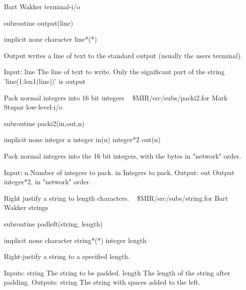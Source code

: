 \newline {} Bart Wakker
\newline {} terminal-i/o
\par{\tenpoint
{\eightpoint\begintt
        subroutine output(line)

        implicit none
        character line*(*)

  Output writes a line of text to the standard output (usually the users
   terminal).

  Input:
    line       The line of text to write. Only the significant part
               of the string 'line(1:len1(line))' is output
\endtt}
\par}
%
\noindent Pack normal integers into 16 bit integers
\newline \ 
\newline {} \$MIR/src/subs/packi2.for
\newline {} Mark Stupar
\newline {} low-level-i/o
\par{\tenpoint
{\eightpoint\begintt
        subroutine packi2(in,out,n)

        implicit none
        integer n
        integer in(n)
        integer*2 out(n)

  Pack normal integers into the 16 bit integers, with the bytes in
  "network" order.

  Input:
    n          Number of integers to pack.
    in         Integers to pack.
  Output:
    out        Output integer*2, in "network" order.
\endtt}
\par}
%
\noindent Right justify a string to length characters.
\newline \ 
\newline {} \$MIR/src/subs/string.for
\newline {} Bart Wakker
\newline \abox{Keywords:} strings
\par{\tenpoint
{\eightpoint\begintt
      subroutine padleft(string, length)

      implicit none
      character string*(*)
      integer length

  Right-justify a string to a specified length.

  Inputs:
    string        The string to be padded.
    length        The length of the string after padding.
  Outputs:
    string        The string with spaces added to the left.
\endtt}
\par}

